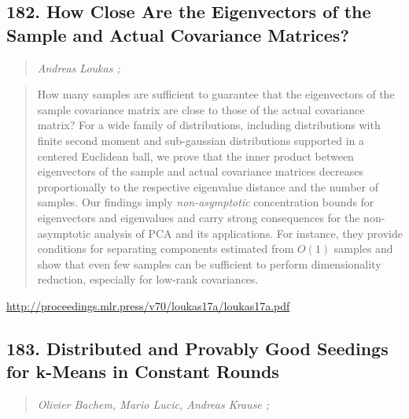 \documentclass{article}
\begin{document}
\subsection{182. How Close Are the Eigenvectors of the Sample and Actual Covariance Matrices?}

\begin{quote}
\footnotesize{\textit{Andreas Loukas ;}}
\end{quote}

\begin{quote}
    How many samples are sufficient to guarantee that the eigenvectors of the sample covariance matrix are close to those of the actual covariance matrix? For a wide family of distributions, including distributions with finite second moment and sub-gaussian distributions supported in a centered Euclidean ball, we prove that the inner product between eigenvectors of the sample and actual covariance matrices decreases proportionally to the respective eigenvalue distance and the number of samples. Our findings imply \textit{non-asymptotic} concentration bounds for eigenvectors and eigenvalues and carry strong consequences for the non-asymptotic analysis of PCA and its applications. For instance, they provide conditions for separating components estimated from $O(1)$ samples and show that even few samples can be sufficient to perform dimensionality reduction, especially for low-rank covariances.  \end{quote}

\href{http://proceedings.mlr.press/v70/loukas17a/loukas17a.pdf}{http://proceedings.mlr.press/v70/loukas17a/loukas17a.pdf}

\subsection{183. Distributed and Provably Good Seedings for k-Means in Constant Rounds}

\begin{quote}
\footnotesize{\textit{Olivier Bachem, Mario Lucic, Andreas Krause ;}}
\end{quote}
\end{document}
